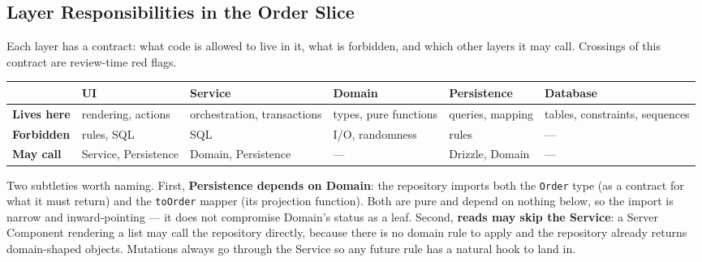 \documentclass[11pt]{article}
\begin{document}
\begin{landscape}
\section{Layer Responsibilities in the Order Slice}

Each layer has a contract: what code is allowed to live in it, what is forbidden, and which other layers it may call. Crossings of this contract are review-time red flags.

\begin{center}
\begin{tabular}{@{}p{2.4cm}p{3.6cm}p{3.6cm}p{3.6cm}p{3.6cm}p{3.6cm}@{}}
\toprule
 & \textbf{UI} & \textbf{Service} & \textbf{Domain} & \textbf{Persistence} & \textbf{Database} \\
\midrule
\textbf{Lives here} & rendering, actions & orchestration, transactions & types, pure functions & queries, mapping & tables, constraints, sequences \\[6pt]
\textbf{Forbidden} & rules, SQL & SQL & I/O, randomness & rules & --- \\[6pt]
\textbf{May call} & Service, Persistence & Domain, Persistence & --- & Drizzle, Domain & --- \\
\bottomrule
\end{tabular}
\end{center}

\noindent Two subtleties worth naming. First, \textbf{Persistence depends on Domain}: the repository imports both the \texttt{Order} type (as a contract for what it must return) and the \texttt{toOrder} mapper (its projection function). Both are pure and depend on nothing below, so the import is narrow and inward-pointing --- it does not compromise Domain's status as a leaf. Second, \textbf{reads may skip the Service}: a Server Component rendering a list may call the repository directly, because there is no domain rule to apply and the repository already returns domain-shaped objects. Mutations always go through the Service so any future rule has a natural hook to land in.
\end{landscape}
\end{document}
